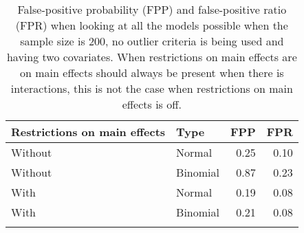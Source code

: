 \begin{longtable}{llrr}
\caption{False-positive probability (FPP) and false-positive ratio (FPR) when looking at all the models possible when the sample size is 200, no outlier criteria is being used and having two covariates. When restrictions on main effects are on main effects should always be present when there is interactions, this is not the case when restrictions on main effects is off.} \\ 
  \hline
Restrictions on main effects & Type & FPP & FPR \\ 
  \hline
Without & Normal & 0.25 & 0.10 \\ 
  Without & Binomial & 0.87 & 0.23 \\ 
  With & Normal & 0.19 & 0.08 \\ 
  With & Binomial & 0.21 & 0.08 \\ 
   \hline
\hline
\label{tab:resultFull}
\end{longtable}
